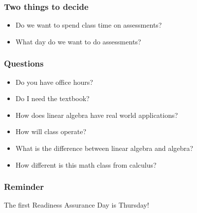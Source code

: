 \documentclass[aspectratio=1610]{beamer}
\begin{document}
\begin{frame}\frametitle{Two things to decide}
\begin{itemize}
\item Do we want to spend class time on assessments?
\pause \item What day do we want to do assessments?
\end{itemize}
\end{frame}

\begin{frame}\frametitle{Questions}

\begin{itemize}
\item Do you have office hours?
\item Do I need the textbook?
\item How does linear algebra have real world applications?
\item How will class operate?
\item What is the difference between linear algebra and algebra?
\item How different is this math class from calculus?
\end{itemize}
\end{frame}



\begin{frame}\frametitle{Reminder}
The first Readiness Assurance Day is Thursday!
\end{frame}
\end{document}

